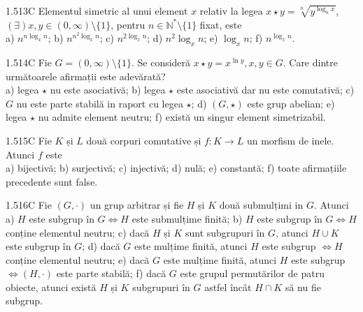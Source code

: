 \documentclass[11pt]{article}
\begin{document}
1.513C Elementul simetric al unui element $x$ relativ la legea $x \star y=\sqrt[n]{y^{\log _{n} x}}$, $(\exists) x, y \in(0, \infty) \setminus\{1\}$, pentru $n \in \mathbb{N}^{*} \setminus\{1\}$ fixat, este\\ a) $n^{n \log _{x} n}$; b) $n^{n^{2} \log _{x} n}$; c) $n^{2 \log _{x} n}$; d) $n^{2} \log _{x} n$; e) $\log _{x} n$; f) $n^{\log _{x} n}$.

1.514C Fie $G=(0, \infty) \setminus\{1\}$. Se consideră $x \star y=x^{\ln y}, x, y \in G$. Care dintre următoarele afirmații este adevărată?\\ a) legea $\star$ nu este asociativă; b) legea $\star$ este asociativă dar nu este comutativă; c) $G$ nu este parte stabilă in raport cu legea $\star$; d) $(G, \star)$ este grup abelian; e) legea $\star$ nu admite element neutru; f) există un singur element simetrizabil.

1.515C Fie $K$ și $L$ două corpuri comutative și $f: K \rightarrow L$ un morfism de inele. Atunci $f$ este\\ a) bijectivă; b) surjectivă; c) injectivă; d) nulă; e) constantă; f) toate afirmațiile precedente sunt false.

1.516C Fie $(G, \cdot)$ un grup arbitrar și fie $H$ și $K$ două submulțimi in $G$. Atunci\\ a) $H$ este subgrup în $G \Leftrightarrow H$ este submulțime finită; b) $H$ este subgrup în $G \Leftrightarrow H$ conține elementul neutru; c) dacă $H$ și $K$ sunt subgrupuri în $G$, atunci $H \cup K$ este subgrup în $G$; d) dacă $G$ este mulțime finită, atunci $H$ este subgrup $\Leftrightarrow H$ conține elementul neutru; e) dacă $G$ este mulțime finită, atunci $H$ este subgrup $\Leftrightarrow(H, \cdot)$ este parte stabilă; f) dacă $G$ este grupul permutărilor de patru obiecte, atunci există $H$ și $K$ subgrupuri în $G$ astfel încât $H \cap K$ să nu fie subgrup.
\end{document}
